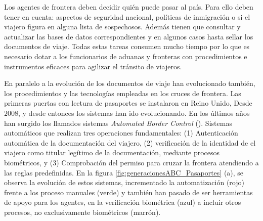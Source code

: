 Los agentes de frontera deben decidir quién puede pasar al país. Para ello deben tener en cuenta: aspectos de seguridad nacional, políticas de inmigración o si el viajero figura en alguna lista de sospechosos. Además tienen que consultar y actualizar las bases de datos correspondientes y en algunos casos hasta sellar los documentos de viaje. Todas estas tareas consumen mucho tiempo por lo que es necesario dotar a los funcionarios de aduanas y fronteras con procedimientos e instrumentos eficaces para agilizar el tránsito de viajeros. 

En paralelo a la evolución de los documentos de viaje han evolucionado también, los procedimientos y las tecnologías empleadas en los cruces de frontera. Las primeras puertas con lectura de pasaportes se instalaron en Reino Unido, Desde $2008$, y desde entonces los sistemas han ido evolucionando. En los últimos años han surgido los llamados sistemas \textit{Automated Border Control} (). Sistemas automáticos que realizan tres operaciones fundamentales: (1) Autenticación automática de la documentación del viajero, (2) verificación de la identidad de el viajero como titular legítimo de la documentación, mediante procesos biométricos, y (3) Comprobación del permiso para cruzar la frontera atendiendo a las reglas predefinidas. En la figura \ref{fig:generacionesABC_Pasaportes} (a), se observa la evolución de estos sistemas, incrementado la automatización (rojo) frente a los proceso manuales (verde) y también han pasado de ser herramientas de apoyo para los agentes, en la verificación biométrica (azul) a incluir otros procesos, no exclusivamente biométricos (marrón). 






